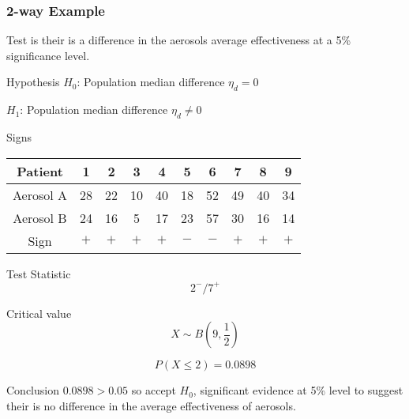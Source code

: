         \subsubsection{2-way Example}
            \begin{example}
            {
            Test is their is a difference in the aerosols average effectiveness at a 5\% significance level.
            }
        
            \begin{step}{Hypothesis}
            $H_0$: Population median difference $\eta_d = 0$
            
            $H_1$: Population median difference $\eta_d \neq 0$
            \end{step}
            
            \begin{step}{Signs}
            \begin{center}
            \begin{tabular}{c|c|c|c|c|c|c|c|c|c}
                Patient     & 1   & 2   & 3   & 4   & 5   & 6   & 7   & 8   & 9   \\
                \hline
                Aerosol A   & 28  & 22  & 10  & 40  & 18  & 52  & 49  & 40  & 34  \\
                Aerosol B   & 24  & 16  & 5   & 17  & 23  & 57  & 30  & 16  & 14  \\
                Sign        & $+$ & $+$ & $+$ & $+$ & $-$ & $-$ & $+$ & $+$ & $+$ \\
            \end{tabular}
            \end{center}
            \end{step}
            
            \begin{step}{Test Statistic}
            $$2^- / 7^+$$
            \end{step}
            
            \begin{step}{Critical value}
            $$X \sim B(9, \frac{1}{2})$$
            
            $$P(X \leq 2) = 0.0898$$
            \end{step}
            
            \begin{step}{Conclusion}
            $0.0898 > 0.05$ so accept $H_0$, significant evidence at 5\% level to suggest their is no difference in the average effectiveness of aerosols.
            \end{step}
            
            \end{example}
        
